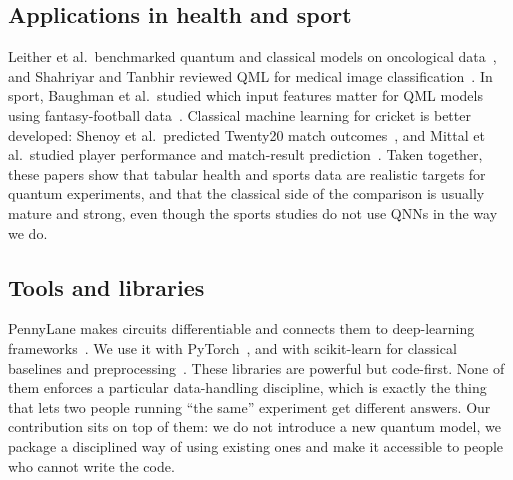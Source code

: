 \documentclass[conference]{IEEEtran}
\begin{document}
\subsection{Applications in health and sport}
Leither et al.\ benchmarked quantum and classical models on oncological data~\cite{leither2026oncology}, and Shahriyar and Tanbhir reviewed QML for medical image classification~\cite{shahriyar2025medical}. In sport, Baughman et al.\ studied which input features matter for QML models using fantasy-football data~\cite{baughman2022feature}. Classical machine learning for cricket is better developed: Shenoy et al.\ predicted Twenty20 match outcomes~\cite{shenoy2022t20}, and Mittal et al.\ studied player performance and match-result prediction~\cite{mittal2021player}. Taken together, these papers show that tabular health and sports data are realistic targets for quantum experiments, and that the classical side of the comparison is usually mature and strong, even though the sports studies do not use QNNs in the way we do.

\subsection{Tools and libraries}
PennyLane makes circuits differentiable and connects them to deep-learning frameworks~\cite{bergholm2018pennylane}. We use it with PyTorch~\cite{paszke2019pytorch}, and with scikit-learn for classical baselines and preprocessing~\cite{pedregosa2011sklearn}. These libraries are powerful but code-first. None of them enforces a particular data-handling discipline, which is exactly the thing that lets two people running ``the same'' experiment get different answers. Our contribution sits on top of them: we do not introduce a new quantum model, we package a disciplined way of using existing ones and make it accessible to people who cannot write the code.
\end{document}
